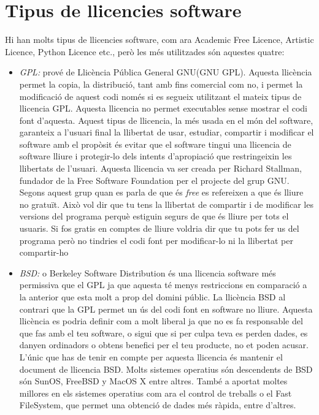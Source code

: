 \section{Tipus de llicencies software}
Hi han molts tipus de llicencies software, com ara Academic Free Licence, Artistic Licence, Python Licence etc., però les més utilitzades són aquestes quatre:
\begin{itemize}
	\item \emph{GPL:} prové de Llicència Pública General GNU(GNU GPL). Aquesta llicència permet la copia, 		la distribució, tant amb fins comercial com no, i permet la modificació de aquest codi només si es 		segueix utilitzant el mateix tipus de llicencia GPL. Aquesta llicencia no permet executables sense 		mostrar el codi font d'aquesta. Aquest tipus de llicencia, la més usada en el món del software, 	garanteix a l'usuari final la llibertat de usar, estudiar, compartir i modificar el software amb el 		propòsit és evitar que el software tingui una llicencia de software lliure i protegir-lo dels intents 		d'apropiació que restringeixin les llibertats de l'usuari. Aquesta llicencia va ser creada per Richard 		Stallman, fundador de la Free Software Foundation per el projecte del grup GNU.
	Segons aquest grup quan es parla de que és \textit{free} es refereixen a que és lliure no gratuït. 		Això vol dir que tu tens la llibertat de compartir i de modificar les versions del programa perquè 		estiguin segurs	de que és lliure per tots el usuaris. Si fos gratis en comptes de lliure voldria dir 		que tu pots fer us del programa però no tindries el codi font per modificar-lo ni la llibertat per 		compartir-ho
	\item \emph{BSD:} o Berkeley Software Distribution és una llicencia software més permissiva que el GPL 		ja que aquesta té menys restriccions en comparació a la anterior que esta molt a prop del domini 		públic. La llicència BSD al contrari que la GPL permet un ús del codi font en software no lliure. 		Aquesta llicència es podria definir com a molt liberal ja que no es fa responsable del que fas amb el 		teu software, o sigui que si per culpa teva es perden dades, es danyen ordinadors o obtens benefici 		per el teu producte, no et poden acusar. L'únic que has de tenir en compte per aquesta llicencia és 		mantenir el document de llicencia BSD. Molts sistemes operatius són descendents de BSD són SunOS, 		FreeBSD y MacOS X entre altres. També a aportat moltes millores en els sistemes operatius com ara el 		control de treballs o el Fast FileSystem, que permet una obtenció de dades més ràpida, entre d'altres.

\end{itemize}

